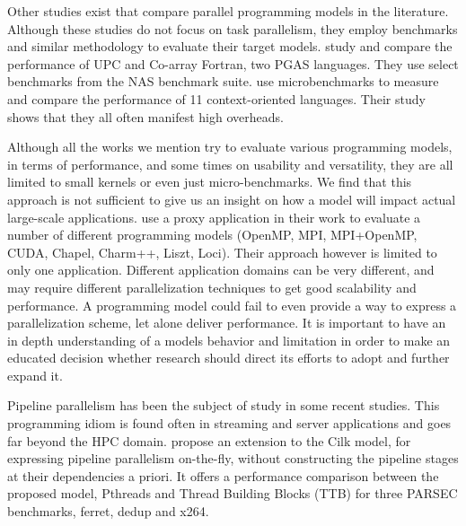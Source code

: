 
Other studies exist that compare parallel programming models in the literature.  Although
these studies do not focus on task parallelism, they employ benchmarks and similar
methodology to evaluate their target models.  \cite{Coarfa:2005:EGA:1065944.1065950} study
and compare the performance of UPC and Co-array Fortran, two PGAS languages.  They use
select benchmarks from the NAS benchmark suite.
\cite{Appeltauer:2009:CCP:1562112.1562118} use microbenchmarks to measure and compare the
performance of 11 context-oriented languages.  Their study shows that they all often
manifest high overheads.


Although all the works we mention try to evaluate various programming models, in terms of
performance, and some times on usability and versatility, they are all limited to small
kernels or even just micro-benchmarks.  We find that this approach is not sufficient to
give us an insight on how a model will impact actual large-scale applications.
\cite{Karlin:2013:ETE:2510661.2511433} use a proxy application in their work to evaluate a
number of different programming models (OpenMP, MPI, MPI+OpenMP, CUDA, Chapel, Charm++,
Liszt, Loci).  Their approach however is limited to only one application.  Different
application domains can be very different, and may require different parallelization
techniques to get good scalability and performance.  A programming model could fail to
even provide a way to express a parallelization scheme, let alone deliver performance.  It
is important to have an in depth understanding of a models behavior and limitation in
order to make an educated decision whether research should direct its efforts to adopt
and further expand it. 


Pipeline parallelism has been the subject of study in some recent studies.  This
programming idiom is found often in streaming and server applications and goes far beyond
the HPC domain.  \cite{Lee:2013:OPP:2486159.2486174} propose an extension to the Cilk
model, for expressing pipeline parallelism on-the-fly, without constructing the pipeline
stages at their dependencies a priori.  It offers a performance comparison between the
proposed model, Pthreads and Thread Building Blocks (TTB) for three PARSEC benchmarks,
ferret, dedup and x264.

